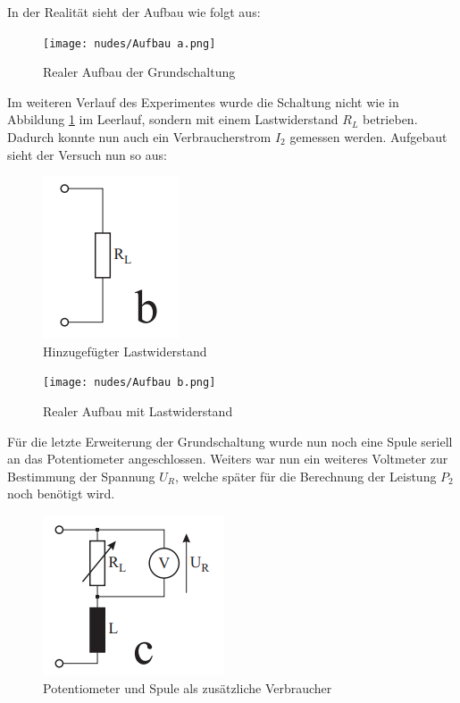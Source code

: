 \documentclass[12pt,a4paper,twoside]{article}
\begin{document}
\noindent
In der Realität sieht der Aufbau wie folgt aus:

\begin{figure}[H]
    \centering
    \texttt{[image: nudes/Aufbau a.png]}
    \caption{Realer Aufbau der Grundschaltung}
    \label{fig:RealerAufbauDerGrundschaltung}
\end{figure}

\noindent
Im weiteren Verlauf des Experimentes wurde die Schaltung nicht wie in Abbildung \ref{fig:RealerAufbauDerGrundschaltung} im Leerlauf, sondern mit einem Lastwiderstand $R_{L}$ betrieben. Dadurch konnte nun auch ein Verbraucherstrom $I_{2}$ gemessen werden. Aufgebaut sieht der Versuch nun so aus:

\begin{figure}[H]
    \centering
    \includegraphics[width=0.2\linewidth, angle=0]{nudes/Versuchsaufbau b.png}
    \caption{Hinzugefügter Lastwiderstand}
    \label{fig:AufbauB}
\end{figure}

\begin{figure}[H]
    \centering
    \texttt{[image: nudes/Aufbau b.png]}
    \caption{Realer Aufbau mit Lastwiderstand}
    \label{fig:RealerAufbauB}
\end{figure}

\noindent
Für die letzte Erweiterung der Grundschaltung wurde nun noch eine Spule seriell an das Potentiometer angeschlossen. Weiters war nun ein weiteres Voltmeter zur Bestimmung der Spannung $U_{R}$, welche später für die Berechnung der Leistung $P_{2}$ noch benötigt wird.

\begin{figure}[H]
    \centering
    \includegraphics[width=0.2\linewidth, angle=0]{nudes/Versuchsaufbau c.png}
    \caption{Potentiometer und Spule als zusätzliche Verbraucher}
    \label{fig:AufbauB}
\end{figure}
\end{document}
